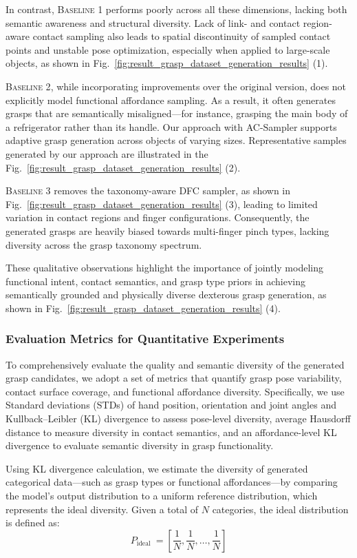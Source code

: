 In contrast, \textsc{Baseline 1} performs poorly across all these dimensions, lacking both semantic awareness and structural diversity. Lack of link- and contact region-aware contact sampling also leads to spatial discontinuity of sampled contact points and unstable pose optimization, especially when applied to large-scale objects, as shown in Fig.~\ref{fig:result_grasp_dataset_generation_results} (1). 

\textsc{Baseline 2}, while incorporating improvements over the original version, does not explicitly model functional affordance sampling. As a result, it often generates grasps that are semantically misaligned—for instance, grasping the main body of a refrigerator rather than its handle. Our approach with AC-Sampler supports adaptive grasp generation across objects of varying sizes. Representative samples generated by our approach are illustrated in the Fig.~\ref{fig:result_grasp_dataset_generation_results} (2). 

\textsc{Baseline 3} removes the taxonomy-aware DFC sampler, as shown in Fig.~\ref{fig:result_grasp_dataset_generation_results} (3), leading to limited variation in contact regions and finger configurations. Consequently, the generated grasps are heavily biased towards multi-finger pinch types, lacking diversity across the grasp taxonomy spectrum.

These qualitative observations highlight the importance of jointly modeling functional intent, contact semantics, and grasp type priors in achieving semantically grounded and physically diverse dexterous grasp generation, as shown in Fig.~\ref{fig:result_grasp_dataset_generation_results} (4).



\subsubsection{Evaluation Metrics for Quantitative Experiments} To comprehensively evaluate the quality and semantic diversity of the generated grasp candidates, we adopt a set of metrics that quantify grasp pose variability, contact surface coverage, and functional affordance diversity. Specifically, we use Standard deviations (STDs) of hand position, orientation and joint angles and Kullback–Leibler (KL) divergence to assess pose-level diversity, average Hausdorff distance to measure diversity in contact semantics, and an affordance-level KL divergence to evaluate semantic diversity in grasp functionality.


Using KL divergence calculation, we estimate the diversity of generated categorical data—such as grasp types or functional affordances—by comparing the model's output distribution to a uniform reference distribution, which represents the ideal diversity. Given a total of $N$ categories, the ideal distribution is defined as:
\begin{equation}
P_{\text {ideal }}=\left[\frac{1}{N}, \frac{1}{N}, \ldots, \frac{1}{N}\right]
\end{equation}

